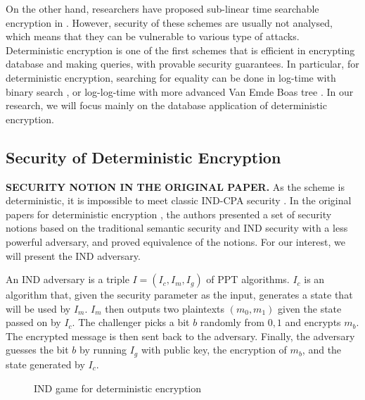 \documentclass[10pt]{book}
\begin{document}
On the other hand, researchers have proposed sub-linear time searchable encryption in \cite{Ozsoyoglu2004, Agrawal:2004:OPE:1007568.1007632, Hacigumus:2002:ESO:564691.564717, Damiani:2003:BCE:948109.948124, Hore:2004:PIR:1316689.1316752, Iyer2004, Li2005, Hacıgümüş2004, doi:10.1201/1086/44530.13.3.20040701/83065.3, Wang:2006:ESQ:1182635.1164140}. However, security of these schemes are usually not analysed, which means that they can be vulnerable to various type of attacks. Deterministic encryption is one of the first schemes that is efficient in encrypting database and making queries, with provable security guarantees. In particular, for deterministic encryption, searching for equality can be done in log-time with binary search \cite{Williams:1976:MHS:503561.503582}, or log-log-time with more advanced Van Emde Boas tree \cite{VANEMDEBOAS197780}. In our research, we will focus mainly on the database application of deterministic encryption.




\subsection{Security of Deterministic Encryption}
\textbf{SECURITY NOTION IN THE ORIGINAL PAPER.} As the scheme is deterministic, it is impossible to meet classic IND-CPA security \cite{GOLDWASSER1984270}. In the original papers for deterministic encryption \cite{Bellare2007, Bellare2008, Bellare2008}, the authors presented a set of security notions based on the traditional semantic security and IND security with a less powerful adversary, and proved equivalence of the notions. For our interest, we will present the IND adversary.

An IND adversary is a triple $I = (I_c, I_m, I_g)$ of PPT algorithms. $I_c$ is an algorithm that, given the security parameter as the input, generates a state that will be used by $I_m$. $I_m$ then outputs two plaintexts $(m_0, m_1)$ given the state passed on by $I_c$. The challenger picks a bit $b$ randomly from ${0, 1}$ and encrypts $m_b$. The encrypted message is then sent back to the adversary. Finally, the adversary guesses the bit $b$ by running $I_g$ with public key, the encryption of $m_b$, and the state generated by $I_c$.

\begin{figure}
\begin{pchstack}[center]
\end{pchstack}

\caption{IND game for deterministic encryption}
\end{figure}
\end{document}
